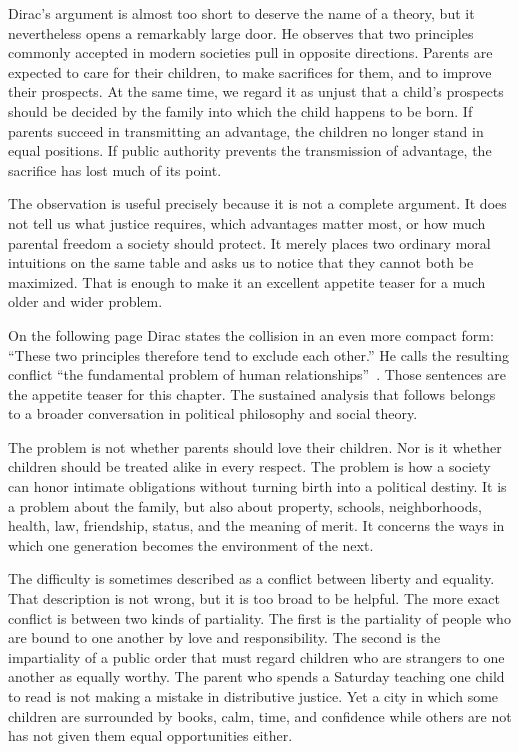 ﻿\documentclass[12pt,a4paper]{book}
\begin{document}
Dirac's argument is almost too short to deserve the name of a theory, but it
nevertheless opens a remarkably large door.  He observes that two principles
commonly accepted in modern societies pull in opposite directions.  Parents
are expected to care for their children, to make sacrifices for them, and to
improve their prospects.  At the same time, we regard it as unjust that a
child's prospects should be decided by the family into which the child
happens to be born.  If parents succeed in transmitting an advantage, the
children no longer stand in equal positions.  If public authority prevents
the transmission of advantage, the sacrifice has lost much of its point.

The observation is useful precisely because it is not a complete argument.
It does not tell us what justice requires, which advantages matter most, or
how much parental freedom a society should protect.  It merely places two
ordinary moral intuitions on the same table and asks us to notice that they
cannot both be maximized.  That is enough to make it an excellent appetite
teaser for a much older and wider problem.

On the following page Dirac states the collision in an even more compact
form: ``These two principles therefore tend to exclude each other.''
He calls the resulting conflict ``the fundamental problem of human
relationships''~\cite[p.~174]{dirac-81}.  Those sentences are the appetite
teaser for this chapter.  The sustained analysis that follows belongs to a
broader conversation in political philosophy and social theory.

The problem is not whether parents should love their children.  Nor is it
whether children should be treated alike in every respect.  The problem is
how a society can honor intimate obligations without turning birth into a
political destiny.  It is a problem about the family, but also about
property, schools, neighborhoods, health, law, friendship, status, and the
meaning of merit.  It concerns the ways in which one generation becomes the
environment of the next.

The difficulty is sometimes described as a conflict between liberty and
equality.  That description is not wrong, but it is too broad to be helpful.
The more exact conflict is between two kinds of partiality.  The first is
the partiality of people who are bound to one another by love and
responsibility.  The second is the impartiality of a public order that must
regard children who are strangers to one another as equally worthy.  The
parent who spends a Saturday teaching one child to read is not making a
mistake in distributive justice.  Yet a city in which some children are
surrounded by books, calm, time, and confidence while others are not has not
given them equal opportunities either.
\end{document}
